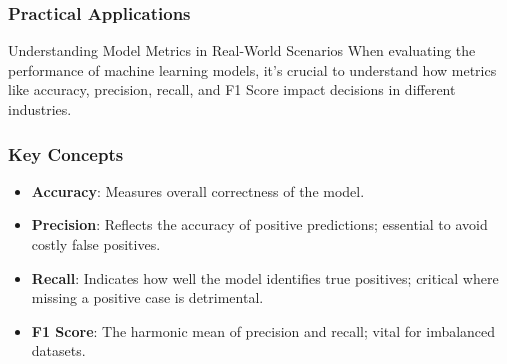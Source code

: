 \documentclass[aspectratio=169]{beamer}
\begin{document}
\begin{frame}[fragile]
    \frametitle{Practical Applications}
    \begin{block}{Understanding Model Metrics in Real-World Scenarios}
        When evaluating the performance of machine learning models, it’s crucial to understand how metrics like accuracy, precision, recall, and F1 Score impact decisions in different industries.
    \end{block}
\end{frame}

\begin{frame}[fragile]
    \frametitle{Key Concepts}
    \begin{itemize}
        \item \textbf{Accuracy}: Measures overall correctness of the model.
        \item \textbf{Precision}: Reflects the accuracy of positive predictions; essential to avoid costly false positives.
        \item \textbf{Recall}: Indicates how well the model identifies true positives; critical where missing a positive case is detrimental.
        \item \textbf{F1 Score}: The harmonic mean of precision and recall; vital for imbalanced datasets.
    \end{itemize}
\end{frame}
\end{document}
